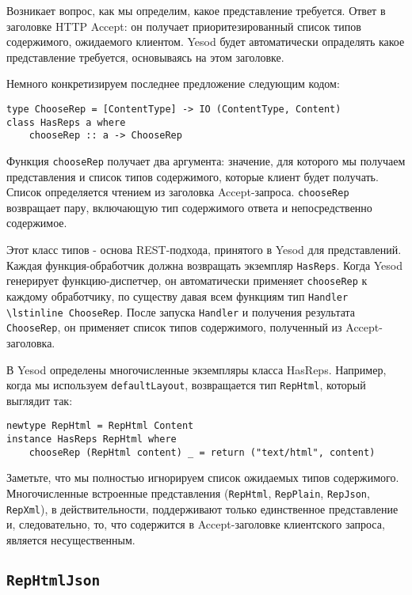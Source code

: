 Возникает вопрос, как мы определим, какое представление требуется. Ответ в заголовке HTTP Accept: он получает приоритезированный список типов содержимого, ожидаемого клиентом. Yesod будет автоматически опраделять какое представление требуется, основываясь на этом заголовке.

Немного конкретизируем последнее предложение следующим кодом:

\begin{lstlisting}
type ChooseRep = [ContentType] -> IO (ContentType, Content)
class HasReps a where
    chooseRep :: a -> ChooseRep
\end{lstlisting}

Функция \lstinline `chooseRep` получает два аргумента: значение, для которого мы получаем представления и список типов содержимого, которые клиент будет получать. Список определяется чтением из заголовка Accept-запроса. \lstinline `chooseRep` возвращает пару, включающую тип содержимого ответа и непосредственно содержимое.

Этот класс типов - основа REST-подхода, принятого в Yesod для представлений. Каждая функция-обработчик должна возвращать экземпляр \lstinline `HasReps`. Когда Yesod генерирует функцию-диспетчер, он автоматически применяет \lstinline 'chooseRep' к каждому обработчику, по существу давая всем функциям тип \lstinline 'Handler \lstinline ChooseRep'. После  запуска \lstinline 'Handler' и получения результата \lstinline 'ChooseRep',  он применяет список типов содержимого, полученный из Accept-заголовка.

В Yesod определены многочисленные экземпляры класса HasReps. Например, когда мы используем \lstinline `defaultLayout`, возвращается тип \lstinline 'RepHtml', который выглядит так:

\begin{lstlisting}
newtype RepHtml = RepHtml Content
instance HasReps RepHtml where
    chooseRep (RepHtml content) _ = return ("text/html", content)
\end{lstlisting}

Заметьте, что мы полностью игнорируем список ожидаемых типов содержимого. Многочисленные встроенные представления (\lstinline 'RepHtml', \lstinline 'RepPlain', \lstinline 'RepJson', \lstinline 'RepXml'), в действительности, поддерживают только единственное представление и, следовательно, то, что содержится в Accept-заголовке клиентского запроса, является несущественным.

\subsection{\lstinline 'RepHtmlJson'}

